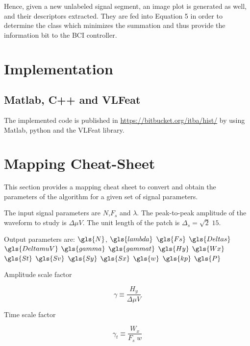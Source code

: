 Hence, given a new unlabeled signal segment, an image plot is generated as well, and their descriptors extracted.  They are fed into Equation 5 in order to determine the class which minimizes the summation and thus provide the information bit to the BCI controller.  

\section{Implementation}

\subsection{Matlab, C++ and VLFeat}

The implemented code is published in \url{https://bitbucket.org/itba/hist/} by using Matlab, python and the VLFeat library.


\section{Mapping Cheat-Sheet}

This section provides a mapping cheat sheet to convert and obtain the parameters of the algorithm for a given set of signal parameters.

The input signal parameters are $N$,$F_s$ and $\lambda$. The peak-to-peak amplitude of the waveform to study is $ \Delta \mu V $. The unit length of the patch is $\Delta_s = \sqrt{2} \; 15$.  

Output parameters are: 
$\gls{N}$, 
$\gls{lambda}$
$\gls{Fs}$
$\gls{Deltas}$
$\gls{DeltamuV}$
$\gls{gamma}$
$\gls{gammat}$
$\gls{Hy}$
$\gls{Wx}$
$\gls{St}$
$\gls{Sv}$
$\gls{Sy}$
$\gls{Sx}$
$\gls{w}$
$\gls{kp}$
$\gls{P}$

Amplitude scale factor

\begin{equation}
\gamma \equiv \frac{H_y}{\Delta \mu V}  
\label{eq:gammadefinition}
\end{equation}

Time scale factor

\begin{equation}
\gamma_t \equiv \frac{W_x}{F_s \; w}  
\label{eq:gammatdefinition}
\end{equation}

%

